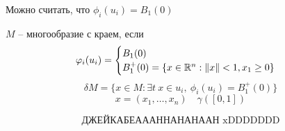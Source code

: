 
    \begin{remark}
        Можно считать, что $\phi_i(u_i) = B_1(0)$
    \end{remark}

    \begin{definition}
        $M$ -- многообразие с краем, если
        \[
            \varphi_i(u_i) = \begin{cases}
                B_1(0) \\
                B_1^+(0) = \{ x \in \mathbb{R}^n : \| x \| < 1, x_1 \ge 0 \}
            \end{cases}    
        \]
        \[
            \delta M = \{ x \in M : \exists t \ x \in u_i , \ \phi_i(u_i) = B_1^+(0) \}
        \]
        \[
            x = (x_1, \dots, x_n) \quad \gamma ([0, 1])   %
        \]
    \end{definition}

    \[
        \text{ДЖЕЙКАБЕАААННАНАНААН xDDDDDDD}    
    \]

    

